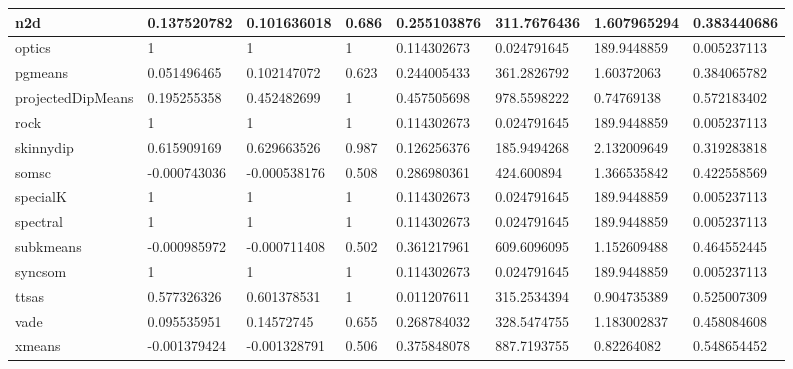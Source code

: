 \begin{table}[H]
\begin{tabular}{|l|l|l|l|l|l|l|l|}
\hline
n2d & 0.137520782 & 0.101636018 & 0.686 & 0.255103876 & 311.7676436 & 1.607965294 & 0.383440686 \\
\hline
optics & 1 & 1 & 1 & 0.114302673 & 0.024791645 & 189.9448859 & 0.005237113 \\
\hline
pgmeans & 0.051496465 & 0.102147072 & 0.623 & 0.244005433 & 361.2826792 & 1.60372063 & 0.384065782 \\
\hline
projectedDipMeans & 0.195255358 & 0.452482699 & 1 & 0.457505698 & 978.5598222 & 0.74769138 & 0.572183402 \\
\hline
rock & 1 & 1 & 1 & 0.114302673 & 0.024791645 & 189.9448859 & 0.005237113 \\
\hline
skinnydip & 0.615909169 & 0.629663526 & 0.987 & 0.126256376 & 185.9494268 & 2.132009649 & 0.319283818 \\
\hline
somsc & -0.000743036 & -0.000538176 & 0.508 & 0.286980361 & 424.600894 & 1.366535842 & 0.422558569 \\
\hline
specialK & 1 & 1 & 1 & 0.114302673 & 0.024791645 & 189.9448859 & 0.005237113 \\
\hline
spectral & 1 & 1 & 1 & 0.114302673 & 0.024791645 & 189.9448859 & 0.005237113 \\
\hline
subkmeans & -0.000985972 & -0.000711408 & 0.502 & 0.361217961 & 609.6096095 & 1.152609488 & 0.464552445 \\
\hline
syncsom & 1 & 1 & 1 & 0.114302673 & 0.024791645 & 189.9448859 & 0.005237113 \\
\hline
ttsas & 0.577326326 & 0.601378531 & 1 & 0.011207611 & 315.2534394 & 0.904735389 & 0.525007309 \\
\hline
vade & 0.095535951 & 0.14572745 & 0.655 & 0.268784032 & 328.5474755 & 1.183002837 & 0.458084608 \\
\hline
xmeans & -0.001379424 & -0.001328791 & 0.506 & 0.375848078 & 887.7193755 & 0.82264082 & 0.548654452 \\
\hline
\end{tabular}
\end{table}

\clearpage

